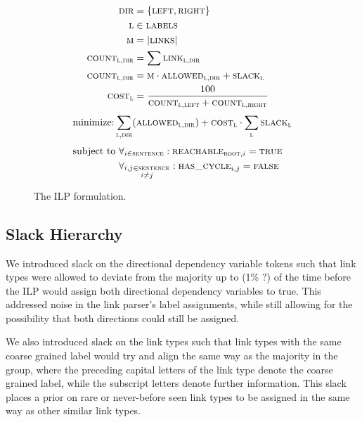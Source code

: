 \documentclass[11pt]{article}
\begin{document}
\begin{figure}
  \small
  \begin{align}
    \textsc{dir} &= \{\textsc{left}, \textsc{right}\} &\\ 
    \textsc{l} &\in \textsc{labels} & \\
    \textsc{m} &= \left|{\textsc{links}}\right| &\\
    \textsc{count}_{\textsc{l}, \textsc{dir}} &= \sum \textsc{link}_{\textsc{l},\textsc{dir}} &\\
    \textsc{count}_{\textsc{l}, \textsc{dir}} &= \textsc{m} \cdot \textsc{allowed}_{\textsc{l},\textsc{dir}} + \textsc{slack}_{\textsc{l}} &\\
    \textsc{cost}_{\textsc{l}} &= \frac{100}{\textsc{count}_{\textsc{l},\textsc{left}} + \textsc{count}_{\textsc{l},\textsc{right}}} &
  \end{align}
  \begin{equation} %
    \text{minimize:} \sum_{\textsc{l}, \textsc{dir}} (\textsc{allowed}_{\textsc{l},\textsc{dir}}) + \textsc{cost}_{\textsc{l}} \cdot \sum_\textsc{l} \textsc{slack}_{\textsc{l}} 
  \end{equation}
  \begin{align}
    \text{subject to } &\forall_{i \in \textsc{sentence}}: \textsc{reachable}_{\textsc{root}, i} = \textsc{true} &\\
                       &\forall_{\substack{i,j \in \textsc{sentence} \\ i\neq j }}: \textsc{has\_cycle}_{i,j} = \textsc{false} &
  \end{align}
  \caption{\small The ILP formulation.}
\end{figure}

\subsection{Slack Hierarchy}

We introduced slack on the directional dependency variable tokens such that link types were allowed to deviate from the majority up to (1\% ?) of the time before the ILP would assign both directional dependency variables to true. This addressed noise in the link parser's label assignments, while still allowing for the possibility that both directions could still be assigned.

\todo{} We also introduced slack on the link types such that link types with the same coarse grained label would try and align the same way as the majority in the group, where the preceding capital letters of the link type denote the coarse grained label, while the subscript letters denote further information. This slack places a prior on rare or never-before seen link types to be assigned in the same way as other similar link types.
\end{document}
